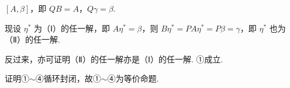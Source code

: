 %
%

\begin{fnote}
$[A,\beta]$，即 $QB=A$，$Q\gamma=\beta$.

现设 $\eta^{*}$ 为（Ⅰ）的任一解，即 $A\eta^{*}=\beta$，则 $B\eta^{*}=PA\eta^{*}=P\beta=\gamma$，即 $\eta^{*}$ 也为（Ⅱ）的任一解.

反过来，亦可证明（Ⅱ）的任一解亦是（Ⅰ）的任一解. ①成立.

证明①$\sim$④循环封闭，故①$\sim$④为等价命题.
\end{fnote}

